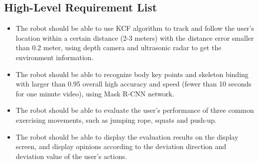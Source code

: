 \subsection{High-Level Requirement List}
\begin{itemize}
\item The robot should be able to use KCF algorithm to track and follow the user’s location within a certain distance (2-3 meters) with the distance error smaller than 0.2 meter, using depth camera and ultrasonic radar to get the environment information. 

\item The robot should be able to recognize body key points and skeleton binding with larger than 0.95 overall high accuracy and speed (fewer than 10 seconds for one minute video), using Mask R-CNN network. 

\item The robot should be able to evaluate the user’s performance of three common exercising movements, such as jumping rope, squats and push-up.

\item The robot should be able to display the evaluation results on the display screen, and display opinions according to the deviation direction and deviation value of the user’s actions.
\end{itemize}